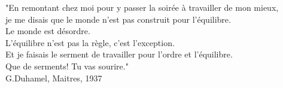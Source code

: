 "En remontant chez moi pour y passer la soirée à travailler de mon mieux, \\
je me disais que le monde n'est pas construit pour l'équilibre.\\
Le monde est désordre. \\
 L'équilibre n'est pas la règle, c'est l'exception.\\
 Et je faisais le serment de travailler pour l'ordre et l’équilibre. \\
Que de serments! Tu vas sourire." \\
G.Duhamel, Maitres, 1937
